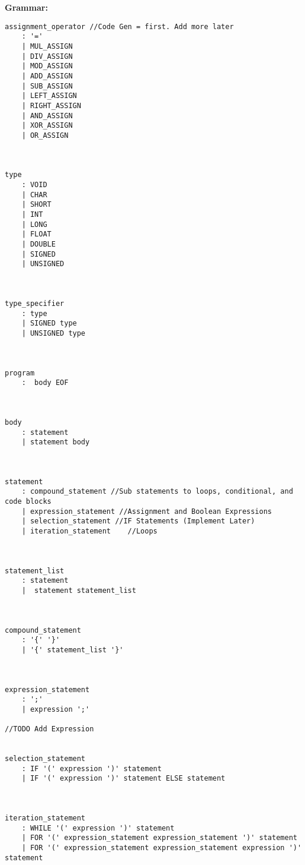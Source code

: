 \documentclass[12pt, letterpaper]{article}
\begin{document}
\fontsize{12}{16}\selectfont

{\color{myblue} \textbf{Grammar:}}


\begin{lstlisting}[]
assignment_operator //Code Gen = first. Add more later
	: '='
	| MUL_ASSIGN
	| DIV_ASSIGN
	| MOD_ASSIGN
	| ADD_ASSIGN
	| SUB_ASSIGN
	| LEFT_ASSIGN
	| RIGHT_ASSIGN
	| AND_ASSIGN
	| XOR_ASSIGN
	| OR_ASSIGN
	
	
	
type
	: VOID
	| CHAR
	| SHORT
	| INT
	| LONG
	| FLOAT
	| DOUBLE
	| SIGNED
	| UNSIGNED
	
	
	
type_specifier
	: type
	| SIGNED type
	| UNSIGNED type
	
	
	
program
	:  body EOF
	
	
	
body
	: statement
	| statement body
	
	
	
statement
	: compound_statement //Sub statements to loops, conditional, and code blocks
	| expression_statement //Assignment and Boolean Expressions
	| selection_statement //IF Statements (Implement Later)
	| iteration_statement	 //Loops
	
	
		
statement_list
	: statement
	|  statement statement_list
	
	

compound_statement
	: '{' '}'
	| '{' statement_list '}'
	
	
	
expression_statement
	: ';'
	| expression ';'

//TODO Add Expression
	
	
selection_statement
	: IF '(' expression ')' statement
	| IF '(' expression ')' statement ELSE statement
	
	
	
iteration_statement
	: WHILE '(' expression ')' statement
	| FOR '(' expression_statement expression_statement ')' statement
	| FOR '(' expression_statement expression_statement expression ')' statement
	

	
	

\end{lstlisting}
\end{document}
